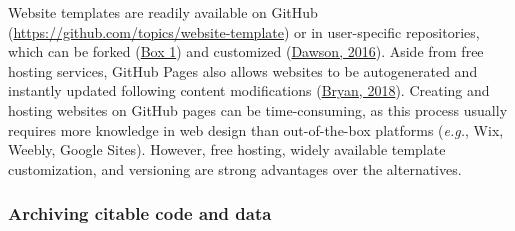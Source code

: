 Website templates are readily available on GitHub (\url{https://github.com/topics/website-template}) or in user-specific repositories, which can be forked (\protect\hyperlink{definitions}{Box 1}) and customized (\protect\hyperlink{ref-MXxgZJ45}{Dawson, 2016}).
Aside from free hosting services, GitHub Pages also allows websites to be autogenerated and instantly updated following content modifications (\protect\hyperlink{ref-RVetqmsg}{Bryan, 2018}).
Creating and hosting websites on GitHub pages can be time-consuming, as this process usually requires more knowledge in web design than out-of-the-box platforms (\emph{e.g.}, Wix, Weebly, Google Sites).
However, free hosting, widely available template customization, and versioning are strong advantages over the alternatives.

\hypertarget{archiving-citable-code-and-data}{%
\subsubsection{Archiving citable code and data}\label{archiving-citable-code-and-data}}

